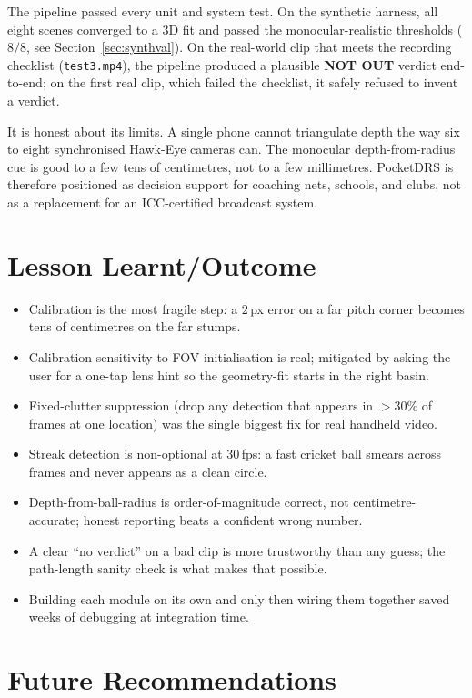 \documentclass[12pt,a4paper]{report}
\begin{document}
The pipeline passed every unit and system test. On the synthetic harness, all eight scenes converged to a 3D fit and passed the monocular-realistic thresholds ($8/8$, see Section~\ref{sec:synthval}). On the real-world clip that meets the recording checklist (\texttt{test3.mp4}), the pipeline produced a plausible \textbf{NOT OUT} verdict end-to-end; on the first real clip, which failed the checklist, it safely refused to invent a verdict.

It is honest about its limits. A single phone cannot triangulate depth the way six to eight synchronised Hawk-Eye cameras can. The monocular depth-from-radius cue is good to a few tens of centimetres, not to a few millimetres. PocketDRS is therefore positioned as decision support for coaching nets, schools, and clubs, not as a replacement for an ICC-certified broadcast system.

\section{Lesson Learnt/Outcome}

\begin{itemize}
    \item Calibration is the most fragile step: a $2$\,px error on a far pitch corner becomes tens of centimetres on the far stumps.
    \item Calibration sensitivity to FOV initialisation is real; mitigated by asking the user for a one-tap lens hint so the geometry-fit starts in the right basin.
    \item Fixed-clutter suppression (drop any detection that appears in $>30\%$ of frames at one location) was the single biggest fix for real handheld video.
    \item Streak detection is non-optional at 30\,fps: a fast cricket ball smears across frames and never appears as a clean circle.
    \item Depth-from-ball-radius is order-of-magnitude correct, not centimetre-accurate; honest reporting beats a confident wrong number.
    \item A clear ``no verdict'' on a bad clip is more trustworthy than any guess; the path-length sanity check is what makes that possible.
    \item Building each module on its own and only then wiring them together saved weeks of debugging at integration time.
\end{itemize}

\section{Future Recommendations}
\end{document}
